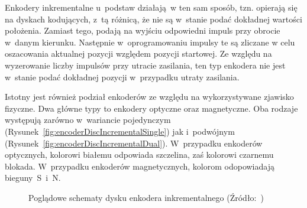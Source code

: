 Enkodery inkrementalne u~podstaw działają~w ten sam sposób, tzn. opierają się na dyskach kodujących, z~tą różnicą, że nie są w~stanie podać dokładnej wartości położenia. Zamiast tego, podają na wyjściu odpowiedni impuls przy obrocie w~danym kierunku. Następnie w~oprogramowaniu impulsy te są zliczane w celu oszacowania aktualnej pozycji względem pozycji startowej. Ze względu na wyzerowanie liczby impulsów przy utracie zasilania, ten typ enkodera nie jest w~stanie podać dokładnej pozycji w~przypadku utraty zasilania.

Istotny jest również podział enkoderów ze względu na wykorzystywane zjawisko fizyczne. Dwa główne typy to enkodery optyczne oraz magnetyczne. Oba rodzaje występują zarówno w~wariancie pojedynczym (Rysunek~\ref{fig:encoderDiscIncrementalSingle}) jak i~podwójnym (Rysunek~\ref{fig:encoderDiscIncrementalDual}). W~przypadku enkoderów optycznych, kolorowi białemu odpowiada szczelina, zaś kolorowi czarnemu blokada. W~przypadku enkoderów magnetycznych, kolorom odopowiadają bieguny~S~i~N.
\vspace*{-0.9cm}
\begin{figure}[!h]
    \centering
    \qquad
    \caption{Poglądowe schematy dysku enkodera inkrementalnego (Źródło:~\cite{bib:tarczeenkoderowinkrementalnych})}
\end{figure}

